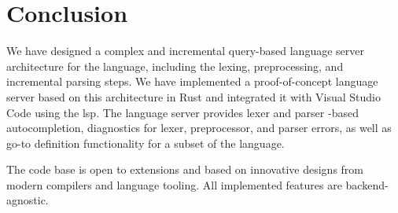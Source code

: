 \chapter*{Conclusion}

We have designed a complex and incremental query-based language server
architecture for the \pfs language, including the lexing, preprocessing, and
incremental parsing steps. We have implemented a proof-of-concept language
server based on this architecture in Rust and integrated it with Visual Studio
Code using the \acrlong{lsp}. The language server provides lexer and parser
-based autocompletion, diagnostics for lexer, preprocessor, and parser errors,
as well as go-to definition functionality for a subset of the \pfs language.

The code base is open to extensions and based on innovative designs from modern
compilers and language tooling. All implemented features are backend-agnostic.
